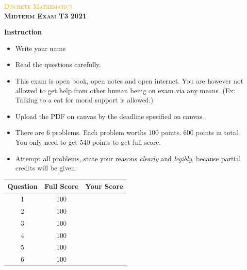 \documentclass[a4paper, 12pt, addpoints]{exam}
\begin{document}
\begin{center}
	\textcolor{orange}{\textsc{Discrete Mathematics}}\\
	\huge\textbf{\textsc{Midterm Exam T3 2021}}\\
\end{center}

\textbf{Instruction}
\begin{itemize}
\item Write your name
\item Read the questions carefully.
\item This exam is open book, open notes and open internet. You are however not allowed to get help from other human being on exam via any means. (Ex: Talking to a cat for moral support is allowed.)
\item Upload the PDF on canvas by the deadline specified on canvas.
\item There are 6 problems. Each problem worths 100 points. 600 points in total. You only need to get 540 points to get full score.
\item Attempt all problems, state your reasons \emph{clearly} and \emph{legibly}, because partial credits will be given.
\end{itemize}
\vspace{0.25in}

	\begin{center}
		\def\arraystretch{1.5}
		\begin{tabular}{|c|c|c|}
			\hline Question & Full Score & Your Score  \\ 
			\hline  1 & 100 &  \\ 
			\hline  2 & 100 &  \\ 
			\hline  3 & 100 &  \\
			\hline  4 & 100 &  \\
			\hline  5 & 100 &  \\
			\hline  6 & 100 &  \\
			\hline 
		\end{tabular} 
	\end{center}
	
\end{document}
